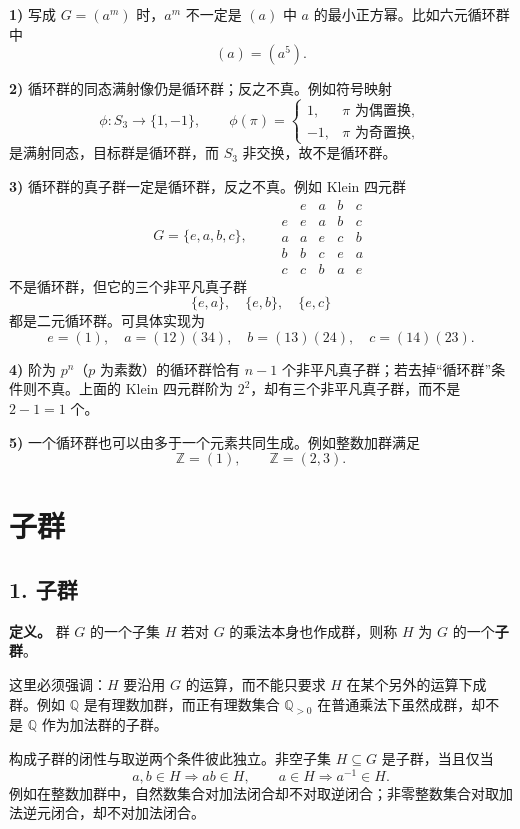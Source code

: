 \textbf{1)} 写成 $G=(a^m)$ 时，$a^m$ 不一定是 $(a)$ 中 $a$ 的最小正方幂。比如六元循环群中
\[
(a)=(a^5).
\]

\textbf{2)} 循环群的同态满射像仍是循环群；反之不真。例如符号映射
\[
\phi:S_3\longrightarrow\{1,-1\},
\qquad
\phi(\pi)=\begin{cases}1,&\pi\text{ 为偶置换},\\-1,&\pi\text{ 为奇置换},\end{cases}
\]
是满射同态，目标群是循环群，而 $S_3$ 非交换，故不是循环群。

\textbf{3)} 循环群的真子群一定是循环群，反之不真。例如 Klein 四元群
\[
G=\{e,a,b,c\},
\qquad
\begin{array}{c|cccc}
 &e&a&b&c\\\hline
 e&e&a&b&c\\
 a&a&e&c&b\\
 b&b&c&e&a\\
 c&c&b&a&e
\end{array}
\]
不是循环群，但它的三个非平凡真子群
\[
\{e,a\},\quad\{e,b\},\quad\{e,c\}
\]
都是二元循环群。可具体实现为
\[
e=(1),\quad a=(12)(34),\quad b=(13)(24),\quad c=(14)(23).
\]

\textbf{4)} 阶为 $p^n$（$p$ 为素数）的循环群恰有 $n-1$ 个非平凡真子群；若去掉“循环群”条件则不真。上面的 Klein 四元群阶为 $2^2$，却有三个非平凡真子群，而不是 $2-1=1$ 个。

\textbf{5)} 一个循环群也可以由多于一个元素共同生成。例如整数加群满足
\[
\mathbb Z=(1),
\qquad
\mathbb Z=(2,3).
\]

\section{子群}

\subsection*{1. 子群}

\textbf{定义。} 群 $G$ 的一个子集 $H$ 若对 $G$ 的乘法本身也作成群，则称 $H$ 为 $G$ 的一个\textbf{子群}。

这里必须强调：$H$ 要沿用 $G$ 的运算，而不能只要求 $H$ 在某个另外的运算下成群。例如 $\mathbb Q$ 是有理数加群，而正有理数集合 $\mathbb Q_{>0}$ 在普通乘法下虽然成群，却不是 $\mathbb Q$ 作为加法群的子群。

构成子群的闭性与取逆两个条件彼此独立。非空子集 $H\subseteq G$ 是子群，当且仅当
\[
a,b\in H\Longrightarrow ab\in H,
\qquad
 a\in H\Longrightarrow a^{-1}\in H.
\]
例如在整数加群中，自然数集合对加法闭合却不对取逆闭合；非零整数集合对取加法逆元闭合，却不对加法闭合。

